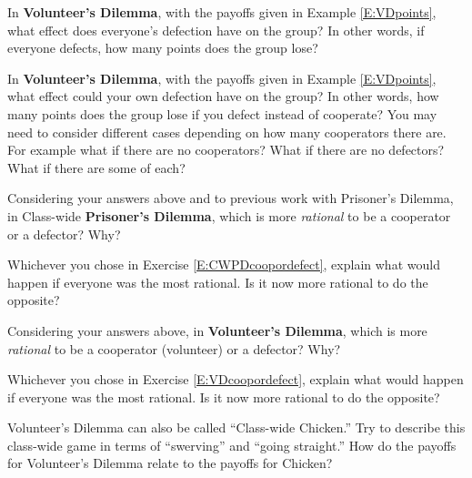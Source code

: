 \begin{xca}\label{E:VDalldefecteffect} 
In \textbf{Volunteer's Dilemma}, with the payoffs given in Example \ref{E:VDpoints}, what effect does everyone's defection have on the group? In other words, if everyone defects, how many points does the group lose?
\end{xca}

\begin{xca}\label{E:VDowndefect} 
In {\bf Volunteer's Dilemma}, with the payoffs given in Example \ref{E:VDpoints}, what effect could your own defection have on the group? In other words, how many points does the group lose if you defect instead of cooperate? You may need to consider different cases depending on how many cooperators there are. For example what if there are no cooperators? What if there are no defectors? What if there are some of each?
\end{xca}

\begin{xca}\label{E:CWPDcoopordefect} 
Considering your answers above and to previous work with Prisoner's Dilemma, in Class-wide \textbf{Prisoner's Dilemma}, which is more \emph{rational} to be a cooperator or a defector? Why?
\end{xca} 

\begin{xca}\label{E:CWPDallrational}
Whichever you chose in Exercise \ref{E:CWPDcoopordefect}, explain what would happen if everyone was the most rational. Is it now more rational to do the opposite?
\end{xca}

\begin{xca}\label{E:VDcoopordefect}
Considering your answers above, in \textbf{Volunteer's Dilemma}, which is more \emph{rational} to be a cooperator (volunteer) or a defector? Why?
\end{xca}


\begin{xca}\label{E:VDallrational}
Whichever you chose in Exercise \ref{E:VDcoopordefect}, explain what would happen if everyone was the most rational. Is it now more rational to do the opposite?
\end{xca}

\begin{xca}\label{E:classchicken}  
Volunteer's Dilemma can also be called ``Class-wide Chicken.'' Try to describe this class-wide game in terms of ``swerving'' and ``going straight.'' How do the payoffs for Volunteer's Dilemma relate to the payoffs for Chicken?
\end{xca}





 